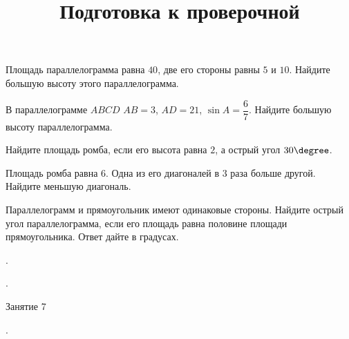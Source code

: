 \begin{class}[number=5-6]
\begin{listofex}
		\item Площадь параллелограмма равна \( 40 \), две его стороны равны \( 5 \) и \( 10 \). Найдите большую высоту этого параллелограмма.
		\item В параллелограмме \( ABCD \) \( AB=3 \), \( AD=21 \),  \( \sin A=\dfrac{6}{7} \).  Найдите большую высоту параллелограмма.
		\item Найдите площадь ромба, если его высота равна \( 2 \), а острый угол \( 30\degree \).
		\item Площадь ромба равна \( 6 \). Одна из его диагоналей в \( 3 \) раза больше другой. Найдите меньшую диагональ.
		\item Параллелограмм и прямоугольник имеют одинаковые стороны. Найдите острый угол параллелограмма, если его площадь равна половине площади прямоугольника. Ответ дайте в градусах.
	\end{listofex}
\end{class}

\begin{class}[number=7]
	\begin{listofex}
		\item .
	\end{listofex}
\end{class}

\begin{homework}[number=3]
	\begin{listofex}
		\item .
	\end{listofex}
\end{homework}

\begin{class}[number=8]
	\title{Подготовка к проверочной}
	\begin{listofex}
		\item Занятие 7
	\end{listofex}
\end{class}

\begin{exam}
	\begin{listofex}
		\item .
	\end{listofex}
\end{exam}
